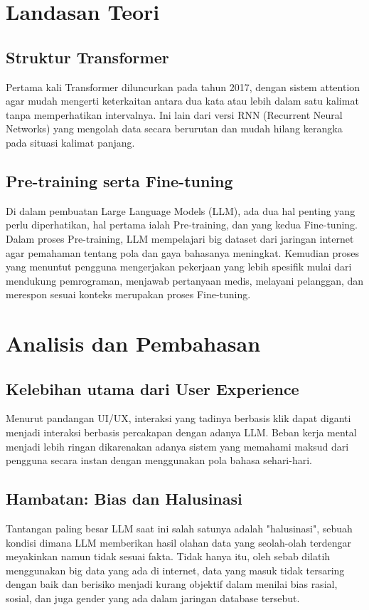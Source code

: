 \documentclass[conference]{IEEEtran}
\begin{document}
\section{Landasan Teori}

\subsection{Struktur Transformer}

Pertama kali Transformer diluncurkan pada tahun 2017, dengan sistem attention agar mudah mengerti keterkaitan antara dua kata atau lebih dalam satu kalimat tanpa memperhatikan intervalnya. Ini lain dari versi RNN (Recurrent Neural Networks) yang mengolah data secara berurutan dan mudah hilang kerangka pada situasi kalimat panjang.

\subsection{Pre-training serta Fine-tuning}

Di dalam pembuatan Large Language Models (LLM), ada dua hal penting yang perlu diperhatikan, hal pertama ialah Pre-training, dan yang kedua Fine-tuning. Dalam proses Pre-training, LLM mempelajari big dataset dari jaringan internet agar pemahaman tentang pola dan gaya bahasanya meningkat. Kemudian proses yang menuntut pengguna mengerjakan pekerjaan yang lebih spesifik mulai dari mendukung pemrograman, menjawab pertanyaan medis, melayani pelanggan, dan merespon sesuai konteks merupakan proses Fine-tuning.

\section{Analisis dan Pembahasan}

\subsection{Kelebihan utama dari User Experience}\label{AA}
Menurut pandangan UI/UX, interaksi yang tadinya berbasis klik dapat diganti menjadi interaksi berbasis percakapan dengan adanya LLM. Beban kerja mental menjadi lebih ringan dikarenakan adanya sistem yang memahami maksud dari pengguna secara instan dengan menggunakan pola bahasa sehari-hari.

\subsection{Hambatan: Bias dan Halusinasi}
Tantangan paling besar LLM saat ini salah satunya adalah "halusinasi", sebuah kondisi dimana LLM memberikan hasil olahan data yang seolah-olah terdengar meyakinkan namun tidak sesuai fakta. Tidak hanya itu, oleh sebab dilatih menggunakan big data yang ada di internet, data yang masuk tidak tersaring dengan baik dan berisiko menjadi kurang objektif dalam menilai bias rasial, sosial, dan juga gender yang ada dalam jaringan database tersebut.
\end{document}
